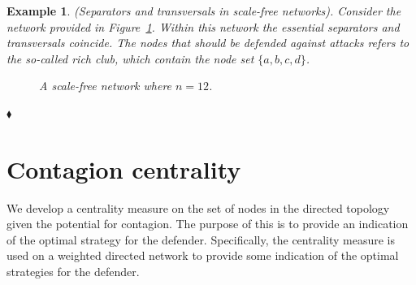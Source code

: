 \documentclass[11pt,fleqn]{article}
\newtheorem{expl}[theorem]{Example}
\newenvironment{example}{\begin{expl} \rm}{\hfill $\blacklozenge$ \end{expl}}{}
\begin{document}
\begin{example} \label{ex:separatorsAndTransversals}
(Separators and transversals in scale-free networks).
Consider the network provided in Figure~\ref{fig:corePeriphery}. Within this network the essential separators and transversals coincide. The nodes that should be defended against attacks refers to the so-called \emph{rich club}, which contain the node set $\{a, b, c, d\}$.

\begin{figure}[t]
\begin{center}
\end{center}
\caption{A scale-free network where $n = 12$.}
\label{fig:corePeriphery}
\end{figure}
\end{example}

\section{Contagion centrality}

We develop a centrality measure on the set of nodes in the directed topology given the potential for contagion. The purpose of this is to provide an indication of the optimal strategy for the defender. Specifically, the centrality measure is used on a weighted directed network to provide some indication of the optimal strategies for the defender.
\end{document}
